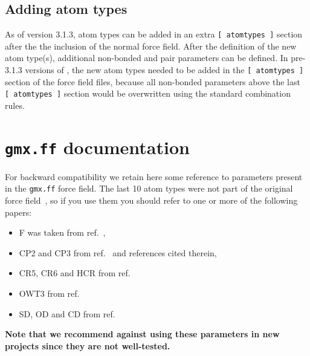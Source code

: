 \subsection{Adding atom types}
As of {\gromacs} version 3.1.3, atom types can be added in an extra
{\tt [~atomtypes~]} section after the the inclusion of the normal
force field. After the definition of the new atom type(s), additional
non-bonded and pair parameters can be defined.
In pre-3.1.3 versions of {\gromacs}, the new atom types needed to be
added in the {\tt [~atomtypes~]} section of the force field files,
because all non-bonded parameters above the last {\tt [~atomtypes~]}
section would be overwritten using the standard combination rules.

\section{{\tt gmx.ff} documentation}
For backward compatibility we retain here some reference to parameters
present in the {\tt gmx.ff} force field. The last 10 atom types were
not part of the original  force field~\cite{biomos}, so
if you use them you should refer to one or more of the following
papers:
\begin{itemize}
\item F was taken from ref.~\cite{Buuren93a}, 
\item CP2 and CP3 from ref.~\cite{Buuren93b} and references cited therein, 
\item CR5, CR6 and HCR from ref.~\cite{Spoel96c}
\item OWT3 from ref.~\cite{Jorgensen83}
\item SD, OD and CD from ref.~\cite{Liu95}
\end{itemize}
{\bf Note that we recommend against using these parameters in new projects
since they are not well-tested.}

